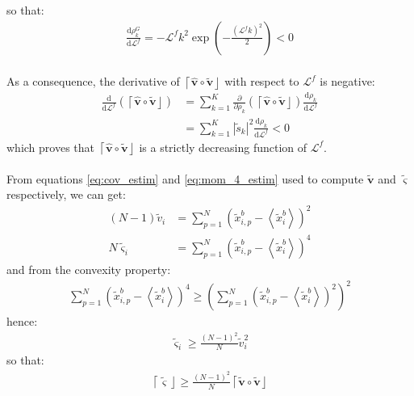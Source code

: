 \documentclass[12pt]{scrartcl}
\begin{document}
so that:
\begin{align}
\frac{\mathrm{d} \rho^G_k}{\mathrm{d}  \mathcal{L}^f} = - \mathcal{L}^f k^2 \exp\left(-\frac{\left(\mathcal{L}^f k\right)^2}{2}\right) < 0
\end{align}
$  $\\
As a consequence, the derivative of $\left\lceil\widehat{\mathbf{v}} \circ \widetilde{\mathbf{v}}\right\rfloor$ with respect to $\mathcal{L}^f$ is negative:
\begin{align}
\frac{\mathrm{d}}{\mathrm{d} \mathcal{L}^f} \left(\left\lceil\widehat{\mathbf{v}} \circ \widetilde{\mathbf{v}}\right\rfloor\right) & = \sum_{k=1}^K  \frac{\partial}{\partial \rho_k} \left(\left\lceil\widehat{\mathbf{v}} \circ \widetilde{\mathbf{v}}\right\rfloor\right)\frac{\mathrm{d} \rho_k}{\mathrm{d} \mathcal{L}^f} \nonumber \\
& = \sum_{k=1}^K \left\vert \widetilde{s}_k \right\vert^2 \frac{\mathrm{d} \rho_k}{\mathrm{d} \mathcal{L}^f} < 0
\end{align}
which proves that $\left\lceil\widehat{\mathbf{v}} \circ \widetilde{\mathbf{v}}\right\rfloor$ is a strictly decreasing function of $\mathcal{L}^f$.\\
$  $\\
From equations \eqref{eq:cov_estim} and \eqref{eq:mom_4_estim} used to compute $\widetilde{\mathbf{v}}$ and $\widetilde{\boldsymbol{\varsigma}}$ respectively, we can get:
\begin{align}
(N-1) \widetilde{v}_i & = \sum_{p=1}^N \left(\widetilde{x}^b_{i,p} - \left\langle \widetilde{x}^b_i \right\rangle\right)^2 \\
N \widetilde{\varsigma}_i & = \sum_{p=1}^N \left(\widetilde{x}^b_{i,p} - \left\langle \widetilde{x}^b_i \right\rangle\right)^4
\end{align}
and from the convexity property:
\begin{align}
\sum_{p=1}^N \left(\widetilde{x}^b_{i,p} - \left\langle \widetilde{x}^b_i \right\rangle\right)^4 \ge \left(\sum_{p=1}^N \left(\widetilde{x}^b_{i,p} - \left\langle \widetilde{x}^b_i \right\rangle\right)^2\right)^2
\end{align}
hence:
\begin{align}
\widetilde{\varsigma}_i \ge \frac{(N-1)^2}{N} \widetilde{v}_i^2
\end{align}
so that:
\begin{align}
\left\lceil\widetilde{\boldsymbol{\varsigma}}\right\rfloor \ge \frac{(N-1)^2}{N} \left\lceil\widetilde{\mathbf{v}} \circ \widetilde{\mathbf{v}}\right\rfloor
\end{align}
\end{document}
